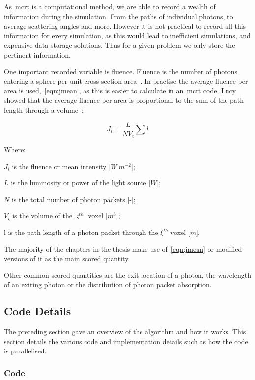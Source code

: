 As~\gls*{mcrt} is a computational method, we are able to record a wealth of information during the simulation.
From the paths of individual photons, to average scattering angles and more.
However it is not practical to record all this information for every simulation, as this would lead to inefficient simulations, and expensive data storage solutions.
Thus for a given problem we only store the pertinent information.

One important recorded variable is fluence.
Fluence is the number of photons entering a sphere per unit cross section area~\cite{rogers1990monte}.
In practise the average fluence per area is used,~\cref{eqn:jmean}, as this is easier to calculate in an~\gls*{mcrt} code.
Lucy showed that the average fluence per area is proportional to the sum of the path length through a volume~\cite{lucy1999computing}:

\begin{equation}
J_i = \frac{L}{NV_{\varsigma}}\sum l 
\label{eqn:jmean}
\end{equation}

\noindent Where:

\indent $J_i$ is the fluence or mean intensity [$W\ m^{-2}$];

\indent $L$ is the luminosity or power of the light source [$W$];

\indent $N$ is the total number of photon packets [-];

\indent $V_{\varsigma}$ is the volume of the $\varsigma^{th}$ voxel [$m^3$];

\indent l is the path length of a photon packet through the $\xi^{th}$ voxel [$m$]. 

\medskip

The majority of the chapters in the thesis make use of~\cref{eqn:jmean} or modified versions of it as the main scored quantity.

Other common scored quantities are the exit location of a photon, the wavelength of an exiting photon or the distribution of photon packet absorption.

\subsection{Code Details}

The preceding section gave an overview of the algorithm and how it works.
This section details the various code and implementation details such as how the code is parallelised.

\subsubsection*{Code}

